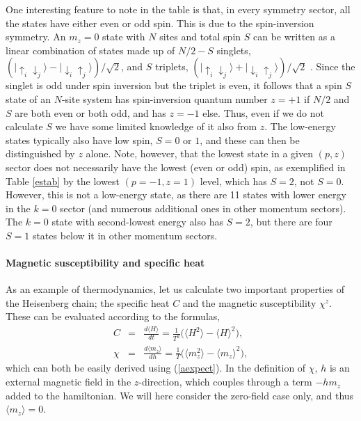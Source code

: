 \documentclass[draft,numberedheadings]{aipproc}
\newcommand{\dn}{\downarrow}
\newcommand{\up}{\uparrow}
\begin{document}
One interesting feature to note in the table is that, in every symmetry sector, all the states have either even or odd spin. This is due to the spin-inversion 
symmetry. An $m_z=0$ state with $N$ sites and total spin $S$ can be written as a linear combination of states made up of $N/2-S$ singlets, 
$(|\up_i\dn_j\rangle - |\dn_i\up_j\rangle)/\sqrt{2}$, and $S$ triplets, $(|\up_i\dn_j\rangle + |\dn_i\up_j\rangle)/\sqrt{2}$ \cite{vbbasis}. 
Since the singlet is odd under spin inversion but the triplet is even, it follows that a spin $S$ state of an $N$-site system 
has spin-inversion quantum number $z=+1$ if $N/2$ and $S$ are both even or both odd, and has $z=-1$ else. Thus, even if we do not calculate $S$ we have 
some limited knowledge of it also from $z$. The low-energy states typically also have low spin, $S=0$ or $1$, and these can then be distinguished by 
$z$ alone. Note, however, that the lowest state in a given $(p,z)$ sector does not necessarily have the lowest (even or odd) spin, as exemplified 
in Table \ref{estab} by the lowest $(p=-1,z=1)$ level, which has $S=2$, not $S=0$. However, this is not a low-energy state, as there are 11 
states with lower energy in the $k=0$ sector (and numerous additional ones in other momentum sectors). The $k=0$ state with second-lowest energy also has 
$S=2$, but there are four $S=1$ states below it in other momentum sectors.

\paragraph{Magnetic susceptibility and specific heat}

As an example of thermodynamics, let us calculate two important properties of the Heisenberg chain; the specific heat $C$ and the magnetic 
susceptibility $\chi^z$. These can be evaluated according to the formulas,
\begin{eqnarray}
\label{cexpr} C      & = & \frac{d\langle H\rangle }{dt} = \frac{1}{T^2}\bigl ( \langle H^2\rangle - \langle H\rangle^2 \bigr ),  \\
\label{xexpr} \chi & = & \frac{d\langle m_z\rangle }{dh} = \frac{1}{T}\bigl ( \langle m_z^2\rangle - \langle m_z\rangle^2 \bigr ), 
\end{eqnarray}
which can both be easily derived using (\ref{aexpect}). In the definition of $\chi$, $h$ is an external magnetic field in the $z$-direction, which 
couples through a term $-hm_z$ added to the hamiltonian. We will here consider the zero-field case only, and thus $\langle m_z\rangle=0$.
\end{document}
